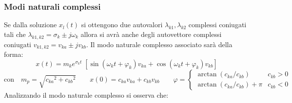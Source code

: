 \newpage

\subsubsection*{Modi naturali complessi}
Se dalla soluzione \(x_l(t)\) si ottengono due autovalori \(\lambda_{k1}, \lambda_{k2}\) complessi coniugati tali che
\(\lambda_{k1,k2} = \sigma_k \pm j\omega_k\) allora si avrà anche degli autovettore complessi coniugati \(v_{k1,k2} = v_{ka} \pm j v_{kb}\).
Il modo naturale complesso associato sarà della forma:
\[x(t) = m_k e^{\sigma_k t} \; [ \sin(\omega_k t + \varphi_k) v_{ka} + \cos (\omega_k t + \varphi_k) v_{kb}]\]
\[\text{con}\quad m_p = \sqrt{{c_{ka}}^2 + {c_{kb}}^2} \qquad x(0) = c_{ka} v_{ka} + c_{kb} v_{kb} \qquad
\varphi = \begin{cases} \arctan (c_{ka} / c_{kb}) & c_{kb} > 0 \\ \arctan (c_{ka} / c_{kb}) + \pi & c_{kb} < 0 \end{cases}\]
Analizzando il modo naturale complesso si osserva che:
